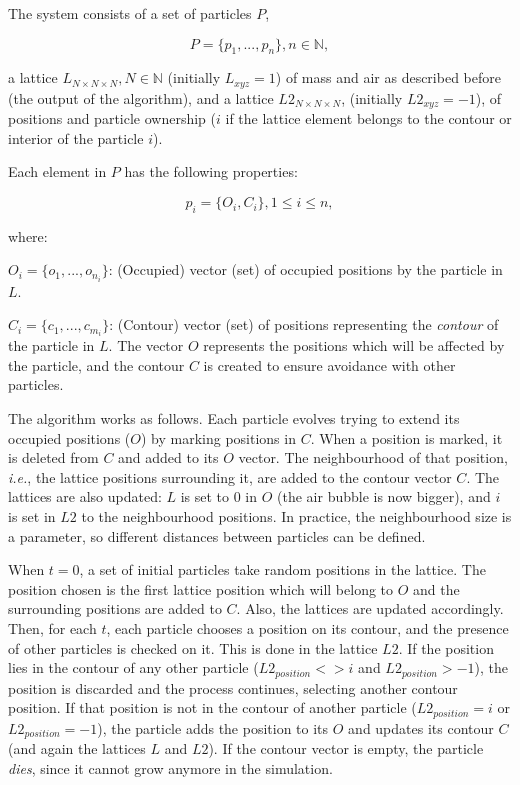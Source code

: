 \documentclass[oneside,a4paper,english,links]{amca}
\begin{document}
The system consists of a set of particles $P$, 

\begin{equation}
  P = \{p_{1}, ... , p_{n}\}, n  \in \mathbb{N},
\end{equation}

\noindent a lattice $L_{N\times N \times N}, N \in \mathbb{N} $ (initially $L_{xyz}=1$) of mass and air as described before (the output of the algorithm), and a lattice $L2_{N\times N \times N}$, (initially $L2_{xyz}=-1$), of positions and particle ownership ($i$ if the lattice element belongs to the contour or interior of the particle $i$).

Each element in $P$ has the following properties:

\begin{equation}
  p_{i} = \{O_{i}, C_{i}\}, 1 \le i \le n,
\end{equation}

\noindent where:

$O_{i} = \{o_{1}, ... , o_{n_{i}}\}$: (Occupied) vector (set) of occupied positions by the particle in $L$.

$C_{i} = \{c_{1}, ... , c_{m_{i}}\}$: (Contour) vector (set) of positions representing the {\em contour} of the particle in $L$. The vector $O$ represents the positions which will be affected by the particle, and the contour $C$ is created to ensure avoidance with other particles.

The algorithm works as follows. Each particle evolves trying to extend
its occupied positions ($O$) by marking positions in $C$. When a
position is marked, it is deleted from $C$ and added to its $O$
vector. The neighbourhood of that position, {\em i.e.}, the lattice
positions surrounding it, are added to the contour vector $C$. The
lattices are also updated: $L$ is set to $0$ in $O$ (the air
bubble is now bigger), and $i$ is set in $L2$ to the neighbourhood
positions. In practice, the neighbourhood size is a parameter, so
different distances between particles can be defined.

When $t = 0$, a set of initial particles take random positions in the lattice. The position chosen is the first lattice position which will belong to $O$ and the surrounding positions are added to $C$. Also, the lattices are updated accordingly. Then, for each $t$, each particle chooses a position on its contour, and the presence of other particles is checked on it. This is done in the lattice $L2$. If the position lies in the contour of any other particle ($L2_{position} <> i$ and $L2_{position} > -1$), the position is discarded and the process continues, selecting another contour position. If that position is not in the contour of another particle ($L2_{position} = i$ or $L2_{position} = -1$), the particle adds the position to its $O$ and updates its contour $C$ (and again the lattices $L$ and $L2$). If the contour vector is empty, the particle {\em dies}, since it cannot grow anymore in the simulation.
\end{document}
